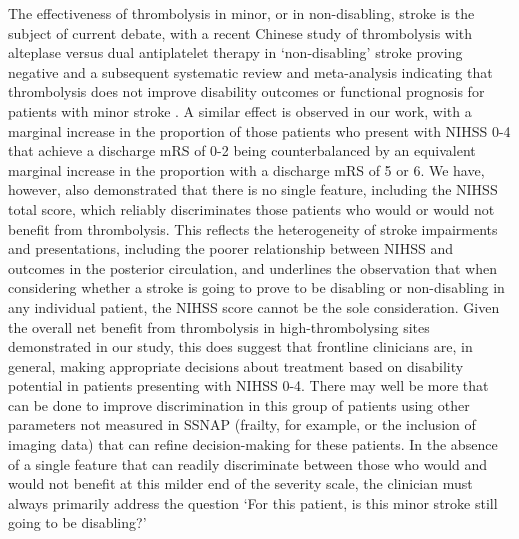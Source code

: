 The effectiveness of thrombolysis in minor, or in non-disabling, stroke is the subject of current debate, with a recent Chinese study of thrombolysis with alteplase versus dual antiplatelet therapy in ‘non-disabling’ stroke\cite{chen_dual_2023} proving negative and a subsequent systematic review and meta-analysis indicating that thrombolysis does not improve disability outcomes or functional prognosis for patients with minor stroke \cite{zhang_intravenous_2024}. A similar effect is observed in our work, with a marginal increase in the proportion of those patients who present with NIHSS 0-4 that achieve a discharge mRS of 0-2 being counterbalanced by an equivalent marginal increase in the proportion with a discharge mRS of 5 or 6. We have, however, also demonstrated that there is no single feature, including the NIHSS total score, which reliably discriminates those patients who would or would not benefit from thrombolysis. This reflects the heterogeneity of stroke impairments and presentations, including the poorer relationship between NIHSS and outcomes in the posterior circulation, and underlines the observation that when considering whether a stroke is going to prove to be disabling or non-disabling in any individual patient, the NIHSS score cannot be the sole consideration\cite{braksick_thrombolysis_2024}. Given the overall net benefit from thrombolysis in high-thrombolysing sites demonstrated in our study, this does suggest that frontline clinicians are, in general, making appropriate decisions about treatment based on disability potential in patients presenting with NIHSS 0-4. There may well be more that can be done to improve discrimination in this group of patients using other parameters not measured in SSNAP (frailty, for example, or the inclusion of imaging data) that can refine decision-making for these patients. In the absence of a single feature that can readily discriminate between those who would and would not benefit at this milder end of the severity scale, the clinician must always primarily address the question ‘For this patient, is this minor stroke still going to be disabling?’

